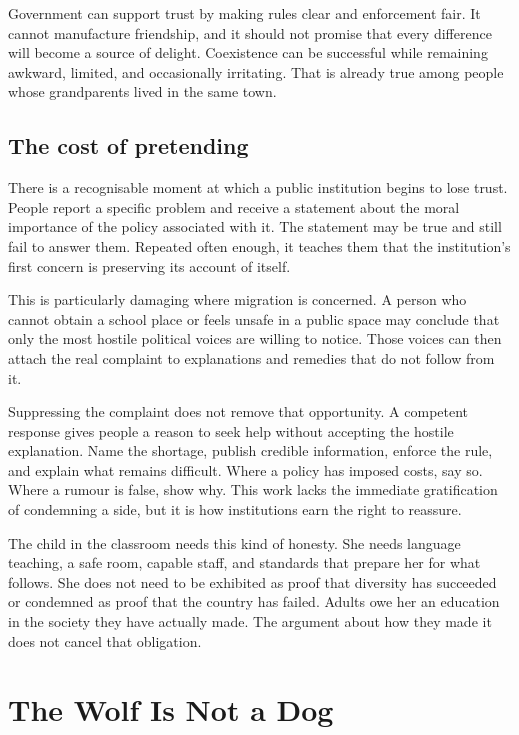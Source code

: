 \documentclass[12pt,a4paper]{book}
\begin{document}
Government can support trust by making rules clear and enforcement fair. It cannot manufacture friendship, and it should not promise that every difference will become a source of delight. Coexistence can be successful while remaining awkward, limited, and occasionally irritating. That is already true among people whose grandparents lived in the same town.

\section*{The cost of pretending}

There is a recognisable moment at which a public institution begins to lose trust. People report a specific problem and receive a statement about the moral importance of the policy associated with it. The statement may be true and still fail to answer them. Repeated often enough, it teaches them that the institution's first concern is preserving its account of itself.

This is particularly damaging where migration is concerned. A person who cannot obtain a school place or feels unsafe in a public space may conclude that only the most hostile political voices are willing to notice. Those voices can then attach the real complaint to explanations and remedies that do not follow from it.

Suppressing the complaint does not remove that opportunity. A competent response gives people a reason to seek help without accepting the hostile explanation. Name the shortage, publish credible information, enforce the rule, and explain what remains difficult. Where a policy has imposed costs, say so. Where a rumour is false, show why. This work lacks the immediate gratification of condemning a side, but it is how institutions earn the right to reassure.

The child in the classroom needs this kind of honesty. She needs language teaching, a safe room, capable staff, and standards that prepare her for what follows. She does not need to be exhibited as proof that diversity has succeeded or condemned as proof that the country has failed. Adults owe her an education in the society they have actually made. The argument about how they made it does not cancel that obligation.

\chapter{The Wolf Is Not a Dog}
\end{document}
